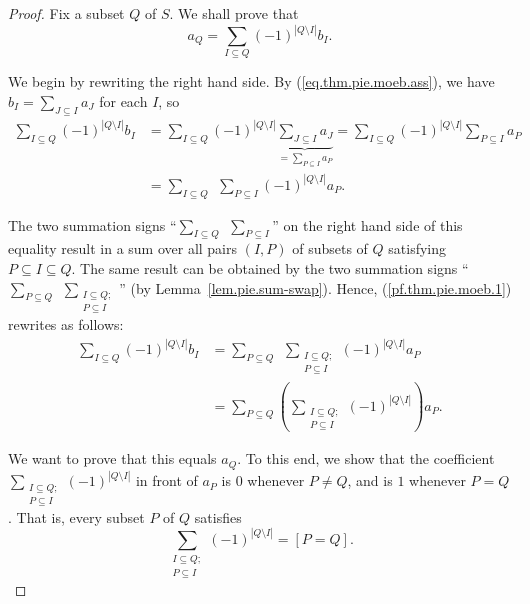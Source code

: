 \begin{proof}
Fix a subset $Q$ of $S$. We shall prove that
\[
a_{Q}=\sum_{I\subseteq Q}\left(  -1\right)  ^{\left\vert Q\setminus
I\right\vert }b_{I}.
\]


We begin by rewriting the right hand side.
By (\ref{eq.thm.pie.moeb.ass}), we have $b_I = \sum_{J \subseteq I} a_J$ for each $I$, so
\begin{align}
\sum_{I\subseteq Q}\left(  -1\right)  ^{\left\vert Q\setminus I\right\vert
}b_{I}  &  =\sum_{I\subseteq Q}\left(  -1\right)
^{\left\vert Q\setminus I\right\vert }\underbrace{\sum_{J\subseteq I}a_{J}%
}_{=\sum_{P\subseteq I}a_{P}}=\sum_{I\subseteq Q}\left(  -1\right)
^{\left\vert Q\setminus I\right\vert }\sum_{P\subseteq I}a_{P}\nonumber\\
&  =\sum_{I\subseteq Q}\ \ \sum_{P\subseteq I}\left(  -1\right)  ^{\left\vert
Q\setminus I\right\vert }a_{P}. \label{pf.thm.pie.moeb.1}
\end{align}


The two summation signs ``$\sum_{I\subseteq Q}\ \ \sum
_{P\subseteq I}$'' on the right hand side of this equality
result in a sum over all pairs $\left(  I,P\right)  $ of subsets of $Q$
satisfying $P\subseteq I\subseteq Q$. The same result can be obtained by the
two summation signs ``$\sum_{P\subseteq Q}\ \ \sum
_{\substack{I\subseteq Q;\\P\subseteq I}}$''
(by Lemma~\ref{lem.pie.sum-swap}).
Hence, (\ref{pf.thm.pie.moeb.1})
rewrites as follows:
\begin{align}
\sum_{I\subseteq Q}\left(  -1\right)  ^{\left\vert Q\setminus I\right\vert
}b_{I}  &  =\sum_{P\subseteq Q}\ \ \sum_{\substack{I\subseteq Q;\\P\subseteq
I}}\left(  -1\right)  ^{\left\vert Q\setminus I\right\vert }a_{P}\nonumber\\
&  =\sum_{P\subseteq Q}\left(  \sum_{\substack{I\subseteq Q;\\P\subseteq
I}}\left(  -1\right)  ^{\left\vert Q\setminus I\right\vert }\right)  a_{P}.
\label{pf.thm.pie.moeb.2}
\end{align}


We want to prove that this equals $a_{Q}$. To this end, we
show that the coefficient $\sum_{\substack{I\subseteq
Q;\\P\subseteq I}}\left(  -1\right)  ^{\left\vert Q\setminus I\right\vert }$
in front of $a_{P}$ is $0$ whenever $P\neq Q$, and is $1$ whenever $P=Q$.
That is, every subset $P$ of $Q$
satisfies
\begin{equation}
\sum_{\substack{I\subseteq Q;\\P\subseteq I}}\left(  -1\right)  ^{\left\vert
Q\setminus I\right\vert }=\left[  P=Q\right]  . \label{pf.thm.pie.moeb.4}
\end{equation}


\end{proof}
